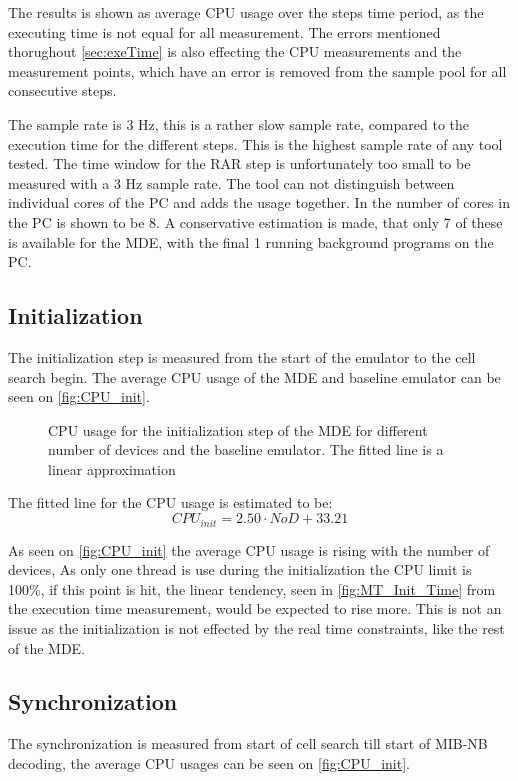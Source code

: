 The results is shown as average CPU usage over the steps time period, as the executing time is not equal for all measurement. The errors mentioned thorughout \autoref{sec:exeTime} is also effecting the CPU measurements and the measurement points, which have an error is removed from the sample pool for all consecutive steps.

The sample rate is 3 Hz, this is a rather slow sample rate, compared to the execution time for the different steps. This is the highest sample rate of any tool tested. The time window for the RAR step is unfortunately too small to be measured with a 3 Hz sample rate. The tool can not distinguish between individual cores of the PC and adds the usage together. In  the number of cores in the PC is shown to be 8. A conservative estimation is made, that only 7 of these is available for the MDE, with the final 1 running background programs on the PC. 

\subsection{Initialization}
The initialization step is measured from the start of the emulator to the cell search begin. The average CPU usage of the MDE and baseline emulator can be seen on \autoref{fig:CPU_init}.

\begin{figure}[H]
\centering
\resizebox{0.5\textwidth}{!}{
}
\caption{CPU usage for the initialization step of the MDE for different number of devices and the baseline emulator. The fitted line is a linear approximation}
\label{fig:CPU_init}
\end{figure}

The fitted line for the CPU usage is estimated to be:
\begin{equation}
CPU_{init} = 2.50 \cdot NoD + 33.21
\end{equation}

As seen on \autoref{fig:CPU_init} the average CPU usage is rising with the number of devices, As only one thread is use during the initialization the CPU limit is 100\%, if this point is hit, the linear tendency, seen in \autoref{fig:MT_Init_Time} from the execution time measurement, would be expected to rise more. This is not an issue as the initialization is not effected by the real time constraints, like the rest of the MDE.

\subsection{Synchronization}
The synchronization is  measured from start of cell search till start of MIB-NB decoding, the average CPU usages can be seen on \autoref{fig:CPU_init}.

